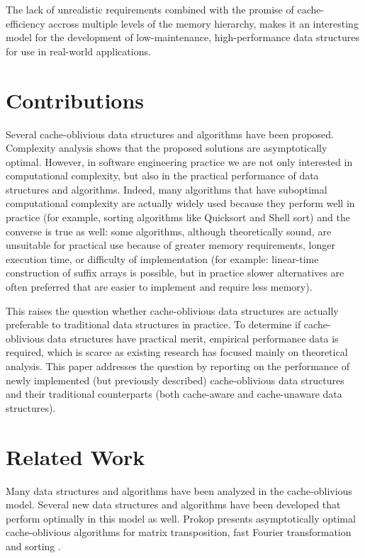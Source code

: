 \documentclass{acm_proc_article-sp}
\begin{document}
The lack of unrealistic requirements combined with the promise of cache-efficiency accross multiple levels of the memory hierarchy, makes it an interesting model for the development of low-maintenance, high-performance data structures for use in real-world applications.

\section{Contributions}
Several cache-oblivious data structures and algorithms have been proposed. Complexity analysis shows that the proposed solutions are asymptotically optimal. However, in software engineering practice we are not only interested in computational complexity, but also in the practical performance of data structures and algorithms. Indeed, many algorithms that have suboptimal computational complexity are actually widely used because they perform well in practice (for example, sorting algorithms like Quicksort and Shell sort) and the converse is true as well: some algorithms, although theoretically sound, are unsuitable for practical use because of greater memory requirements, longer execution time, or difficulty of implementation (for example: linear-time construction of suffix arrays is possible, but in practice slower alternatives are often preferred that are easier to implement and require less memory).

This raises the question whether cache-oblivious data structures are actually preferable to traditional data structures in practice. To determine if cache-oblivious data structures have practical merit, empirical performance data is required, which is scarce as existing research has focused mainly on theoretical analysis. This paper addresses the question by reporting on the performance of newly implemented (but previously described) cache-oblivious data structures and their traditional counterparts (both cache-aware and cache-unaware data structures).

\section{Related Work}
\label{sect-related-work}
Many data structures and algorithms have been analyzed in the cache-oblivious model. Several new data structures and algorithms have been developed that perform optimally in this mo\-del as well. Prokop presents asymptotically optimal cache-oblivious algorithms for matrix transposition, fast Fourier transformation and sorting \cite{prokop1999coa}.
\end{document}
